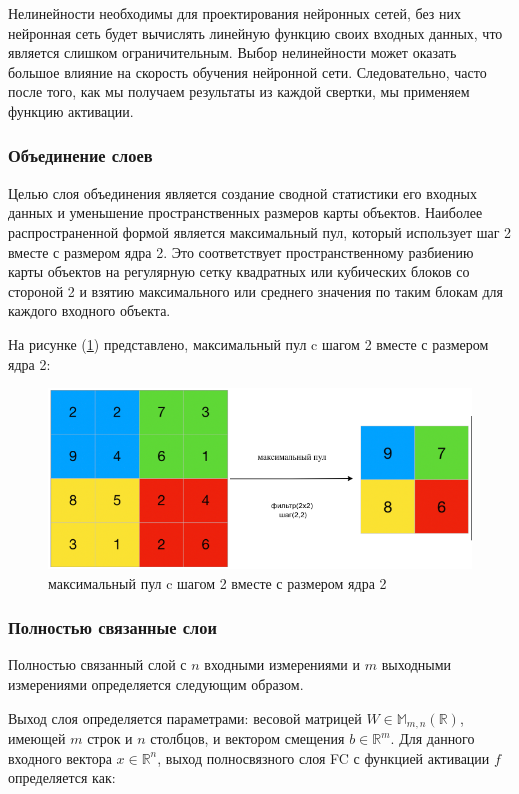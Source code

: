 Нелинейности необходимы для проектирования нейронных сетей, без них нейронная сеть будет вычислять линейную функцию своих входных данных, что является слишком ограничительным. Выбор нелинейности может оказать большое влияние на скорость обучения нейронной сети. Следовательно, часто после того, как мы получаем результаты из каждой свертки, мы применяем функцию активации.

\subsubsection*{Объединение слоев}

Целью слоя объединения является создание сводной статистики его входных данных и уменьшение пространственных размеров карты объектов. Наиболее распространенной формой является максимальный пул, который использует шаг 2 вместе с размером ядра 2. Это соответствует пространственному разбиению карты объектов на регулярную сетку квадратных или кубических блоков со стороной 2 и взятию максимального или среднего значения по таким блокам для каждого входного объекта.

На рисунке (\ref{fig:max-pool}) представлено, максимальный пул c шагом 2 вместе с размером ядра 2: 
\begin{figure}[H]
	\centering
	\includegraphics[width=0.5\linewidth]{images/max-pooling.png}
	\caption{максимальный пул c шагом 2 вместе с размером ядра 2}
	\label{fig:max-pool}
\end{figure}

\subsubsection*{Полностью связанные слои}

Полностью связанный слой с \(n\) входными измерениями и \(m\) выходными измерениями определяется следующим образом.

Выход слоя определяется параметрами: весовой матрицей \(W \in \mathbb{M}_{m,n}(\mathbb{R})\), имеющей \(m\) строк и \(n\) столбцов, и вектором смещения \(b \in \mathbb{R}^{m}\). Для данного входного вектора \(x \in \mathbb{R}^{n}\), выход полносвязного слоя FC с функцией активации \(f\) определяется как:

